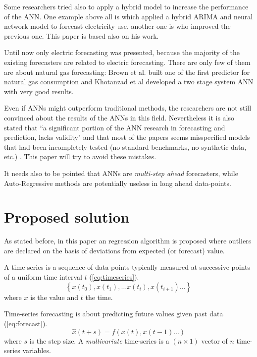 \documentclass{sig-alternate-sigmod07}
\begin{document}
Some researchers tried also to apply a hybrid model to increase the performance of the ANN. One example above all is \cite{zhang2003time} which applied a hybrid ARIMA and neural network model to forecast electricity use, another one is \cite{khashei2010artificial} who improved the previous one. This paper is based also on his work.

Until now only electric forecasting was presented, because the majority of the existing forecasters are related to electric forecasting. There are only few of them are about natural gas forecasting: Brown et al.\cite{brown1995development} built one of the first predictor for natural gas consumption and Khotanzad et al \cite{khotanzad2000combination} developed a two stage system ANN with very good results.

Even if ANNs might outperform traditional methods, the researchers are not still convinced about the results of the ANNs in this field. Nevertheless it is also stated that ``a significant portion of the ANN research in forecasting and prediction, lacks validity" \cite{adya1998ective} and that most of the papers seems misspecified models that had been incompletely tested (no standard benchmarks, no synthetic data, etc.) \cite{hippert2001neural}. This paper will try to avoid these mistakes.

It needs also to be pointed that ANNs are \emph{multi-step ahead} forecasters, while Auto-Regressive methods are potentially useless in long ahead data-points.

\section{Proposed solution}
\label{sec:proposedSolution}

As stated before, in this paper an regression algorithm is proposed where outliers are declared on the basis of deviations from expected (or forecast) value.

A time-series is a sequence of data-points typically measured at successive points of a uniform time interval $t$ (\cref{eq:timeseries}).
\begin{equation}\label{eq:timeseries}\left\{x(t_0), x(t_1), \ldots x(t_i), x(t_{i+1}) \ldots \right\}\end{equation}
where $x$ is the value and $t$ the time.

Time-series forecasting is about predicting future values given past data (\cref{eq:forecast}). 
\begin{equation}\label{eq:forecast}\hat{x}(t+s) = f\left(x(t), x(t-1) \ldots \right) \end{equation}
where $s$ is the step size. A \emph{multivariate} time-series is a $(n\times1)$ vector of $n$ time-series variables.
\end{document}
